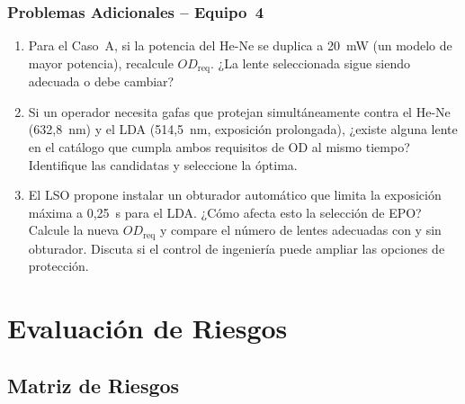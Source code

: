 \documentclass[12pt,a4paper]{article}
\begin{document}
\subsubsection*{Problemas Adicionales -- Equipo~4}

\begin{enumerate}
	\item[\textbf{P4.1}] Para el Caso~A, si la potencia del He-Ne se duplica
	      a 20~mW (un modelo de mayor potencia), recalcule $OD_{\mathrm{req}}$.
	      ¿La lente seleccionada sigue siendo adecuada o debe cambiar?

	\item[\textbf{P4.2}] Si un operador necesita gafas que protejan
	      simultáneamente contra el He-Ne (632,8~nm) y el LDA (514,5~nm,
	      exposición prolongada), ¿existe alguna lente en el catálogo que
	      cumpla ambos requisitos de OD al mismo tiempo? Identifique las
	      candidatas y seleccione la óptima.

	\item[\textbf{P4.3}] El LSO propone instalar un obturador automático que
	      limita la exposición máxima a 0,25~s para el LDA. ¿Cómo afecta esto
	      la selección de EPO? Calcule la nueva $OD_{\mathrm{req}}$ y compare
	      el número de lentes adecuadas con y sin obturador. Discuta si el
	      control de ingeniería puede ampliar las opciones de protección.
\end{enumerate}

\section{Evaluación de Riesgos}
\label{sec:riesgos}

\subsection{Matriz de Riesgos}
\end{document}
